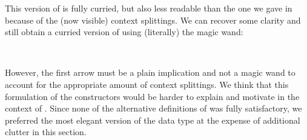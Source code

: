 \begin{remark}
    This version of  is fully curried, but also
    less readable than the one we gave in  because of the
    (now visible) context splittings. We can recover some clarity and still
    obtain a curried version of  using
    (literally) the magic wand:
\begin{code}[hide]%
\>[0]\AgdaSpace{}%
\AgdaSpace{}%
\AgdaSymbol{:}\AgdaSpace{}%
\AgdaSpace{}%
\AgdaSpace{}%
\AgdaSpace{}%
\<%
\end{code}
\begin{code}%
\>[0][@{}l@{\AgdaIndent{1}}]%
\>[2]\AgdaSpace{}%
\AgdaSymbol{:}%
\>[389I]\AgdaSpace{}%
\AgdaSymbol{\}}\AgdaSpace{}%
\<%
\\
\>[.][@{}l@{}]\<[389I]%
\>[9]\AgdaFunction{∀[}\AgdaSpace{}%
\AgdaSpace{}%
\AgdaSymbol{(}\AgdaSpace{}%
\AgdaSpace{}%
\AgdaSymbol{)}\AgdaSpace{}%
\AgdaSpace{}%
\AgdaSymbol{(}\AgdaSpace{}%
\AgdaSymbol{)}\AgdaSpace{}%
\AgdaSpace{}%
\AgdaSpace{}%
\AgdaSpace{}%
\AgdaSymbol{(}\AgdaSpace{}%
\AgdaSymbol{)}\AgdaSpace{}%
\AgdaSpace{}%
\AgdaSpace{}%
\AgdaSpace{}%
\AgdaSpace{}%
\AgdaFunction{]}\<%
\end{code}

    However, the first arrow must be a plain implication  and
    not a magic wand to account for the appropriate amount of context
    splittings. We think that this formulation of the constructors would be
    harder to explain and motivate in the context of .
    Since none of the alternative definitions of  was fully
    satisfactory, we preferred the most elegant version of the data type at the
    expense of additional clutter in this section.
    \eoe
\end{remark}
